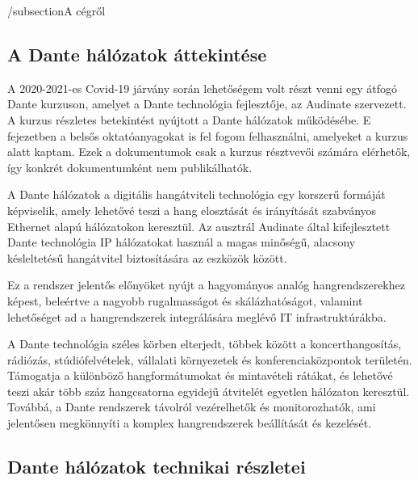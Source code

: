 /subsection{A cégről}





\subsection{A Dante hálózatok áttekintése}

A 2020-2021-es Covid-19 járvány során lehetőségem volt részt venni egy átfogó Dante
kurzuson, amelyet a Dante technológia fejlesztője, az Audinate szervezett. A kurzus
részletes betekintést nyújtott a Dante hálózatok működésébe. E fejezetben a belsős
oktatóanyagokat is fel fogom felhasználni, amelyeket a kurzus alatt kaptam. Ezek a dokumentumok
csak a kurzus résztvevői számára elérhetők, így konkrét dokumentumként nem publikálhatók. 

A Dante hálózatok a digitális hangátviteli technológia egy korszerű formáját képviselik, 
amely lehetővé teszi a hang elosztását és irányítását szabványos Ethernet alapú hálózatokon 
keresztül. Az ausztrál Audinate által kifejlesztett Dante technológia IP hálózatokat használ 
a magas minőségű, alacsony késleltetésű hangátvitel biztosítására az eszközök között. 

Ez a rendszer jelentős előnyöket nyújt a hagyományos analóg hangrendszerekhez képest, 
beleértve a nagyobb rugalmasságot és skálázhatóságot, valamint lehetőséget ad a hangrendszerek 
integrálására meglévő IT infrastruktúrákba. 

A Dante technológia széles körben elterjedt, többek között a koncerthangosítás, rádiózás, 
stúdiófelvételek, vállalati környezetek és konferenciaközpontok területén. Támogatja a különböző 
hangformátumokat és mintavételi rátákat, és lehetővé teszi akár több száz hangcsatorna egyidejű 
átvitelét egyetlen hálózaton keresztül. Továbbá, a Dante rendszerek távolról vezérelhetők és 
monitorozhatók, ami jelentősen megkönnyíti a komplex hangrendszerek beállítását és kezelését.


\subsection{Dante hálózatok technikai részletei}


